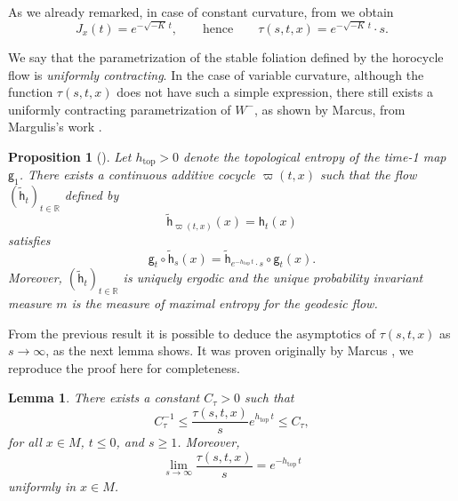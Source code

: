 \documentclass[11pt,letterpaper]{amsart}
\newcommand \R {{ \mathbb R}}
\newcommand{\horo}{\mathsf{h}}
\newcommand{\geo}{\mathsf{g}}
\DeclareMathOperator{\topp}{top}
\newtheorem {lemma}[theorem]{Lemma}
\newtheorem {proposition}[theorem]{Proposition}
\theoremstyle{definition}
\begin{document}
As we already remarked, in case of constant curvature, from  we obtain
\[
J_x(t) = e^{-\sqrt{-K} \, t}, \qquad \text{hence} \qquad \tau(s,t,x) = e^{-\sqrt{-K} \, t} \cdot s.
\]


We say that the parametrization of the stable foliation defined by the horocycle flow is \emph{uniformly contracting}.
In the case of variable curvature, although the function $\tau(s,t,x)$ does not have such a simple expression, there still exists a uniformly contracting parametrization of $W^{-}$, as shown by Marcus, from Margulis's work \cite{Marcus, Margulis}.

\begin{proposition}[{\cite{Marcus, Margulis}}]\label{prop:Margulis}
Let $h_{\topp} >0$ denote the topological entropy of the time-1 map $\geo_1$. There exists a continuous additive cocycle $\varpi(t,x)$ such that the flow $(\widetilde{\horo}_t)_{t \in \R}$ defined by
\[
\widetilde{\horo}_{\varpi(t,x)}(x) = \horo_t(x)
\]
satisfies
\[
\geo_t \circ \widetilde{\horo}_s(x) = \widetilde{\horo}_{e^{-h_{\topp} \, t} \cdot s} \circ \geo_t(x).
\]
Moreover, $(\widetilde{\horo}_t)_{t \in \R}$ is uniquely ergodic and the unique probability invariant measure $m$ is the measure of maximal entropy for the geodesic flow.
\end{proposition}
From the previous result it is possible to deduce the asymptotics of $\tau(s,t,x)$ as $s \to \infty$, as the next lemma shows. It was proven originally by Marcus \cite{Marcus2}, we reproduce the proof here for completeness.
%
\begin{lemma}\label{lemma:Marcus}
There exists a constant $C_\tau >0$ such that
\[
C_\tau^{-1} \leq \frac{\tau(s,t,x)}{s} e^{h_{\topp} \, t} \leq C_\tau,
\]
for all $x \in M$, $t \leq 0$, and $s \geq 1$. Moreover,
\[
\lim_{s \to \infty} \frac{\tau(s,t,x)}{s} = e^{-h_{\topp} \, t}
\]
uniformly in $x \in M$.
\end{lemma}
\end{document}
